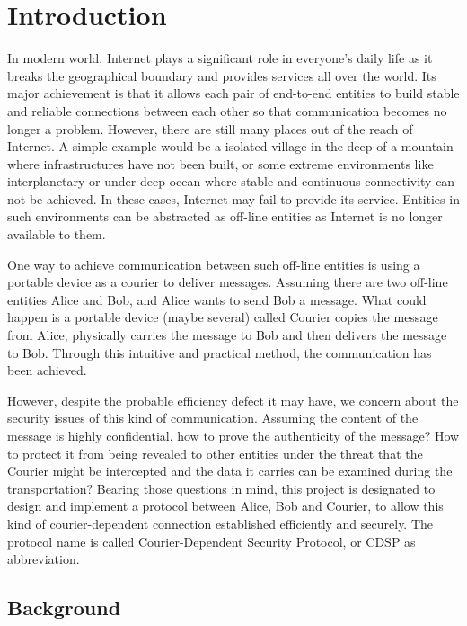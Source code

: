 \chapter{Introduction}
In modern world, Internet plays a significant role in everyone's daily life as it breaks the geographical boundary and provides services all over the world. Its major achievement is that it allows each pair of end-to-end entities to build stable and reliable connections between each other so that communication becomes no longer a problem. However, there are still many places out of the reach of Internet. A simple example would be a isolated village in the deep of a mountain where infrastructures have not been built, or some extreme environments like interplanetary or under deep ocean where stable and continuous connectivity can not be achieved. In these cases, Internet may fail to provide its service. Entities in such environments can be abstracted as off-line entities as Internet is no longer available to them.

One way to achieve communication between such off-line entities is using a portable device as a courier to deliver messages. Assuming there are two off-line entities Alice and Bob, and Alice wants to send Bob a message. What could happen is a portable device (maybe several) called Courier copies the message from Alice, physically carries the message to Bob and then delivers the message to Bob. Through this intuitive and practical method, the communication has been achieved.

However, despite the probable efficiency defect it may have, we concern about the security issues of this kind of communication. Assuming the content of the message is highly confidential, how to prove the authenticity of the message? How to protect it from being revealed to other entities under the threat that the Courier might be intercepted and the data it carries can be examined during the transportation? Bearing those questions in mind, this project is designated to design and implement a protocol between Alice, Bob and Courier, to allow this kind of courier-dependent connection established efficiently and securely. The protocol name is called Courier-Dependent Security Protocol, or CDSP as abbreviation.

\section{Background}
